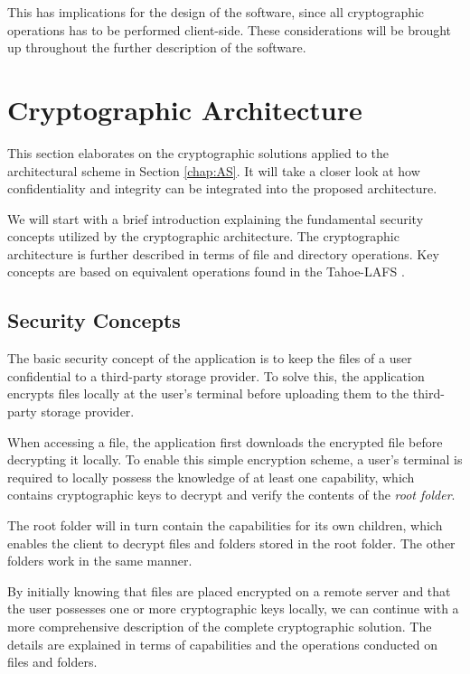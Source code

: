 \documentclass[pdftex,english,10pt,b5paper,twoside]{book}
\begin{document}
This has implications for the design of the software, since all cryptographic
operations has to be performed client-side. These considerations will be
brought up throughout the further description of the software.

\section{Cryptographic Architecture}
\label{chap:CS}

This section elaborates on the cryptographic solutions applied to the
architectural scheme in Section \ref{chap:AS}. It will take a closer look at
how confidentiality and integrity can be integrated into the proposed
architecture.

We will start with a brief introduction explaining the fundamental security
concepts utilized by the cryptographic architecture. The cryptographic
architecture is further described in terms of file and directory operations.
Key concepts are based on equivalent operations found in the Tahoe-\ac{LAFS}
\cite{tahoe}.

\subsection{Security Concepts}

The basic security concept of the application is to keep the files of a user
confidential to a third-party storage provider. To solve this, the application
encrypts files locally at the user's terminal before uploading them to the
third-party storage provider.

When accessing a file, the application first downloads the encrypted file
before decrypting it locally. To enable this simple encryption scheme, a user's
terminal is required to locally possess the knowledge of at least one
capability, which contains cryptographic keys to decrypt and verify the
contents of the \emph{root folder}.

The root folder will in turn contain the capabilities for its own children,
which enables the client to decrypt files and folders stored in the root
folder. The other folders work in the same manner.

By initially knowing that files are placed encrypted on a remote server and
that the user possesses one or more cryptographic keys locally, we can continue
with a more comprehensive description of the complete cryptographic solution.
The details are explained in terms of capabilities and the operations conducted
on files and folders.
\end{document}
